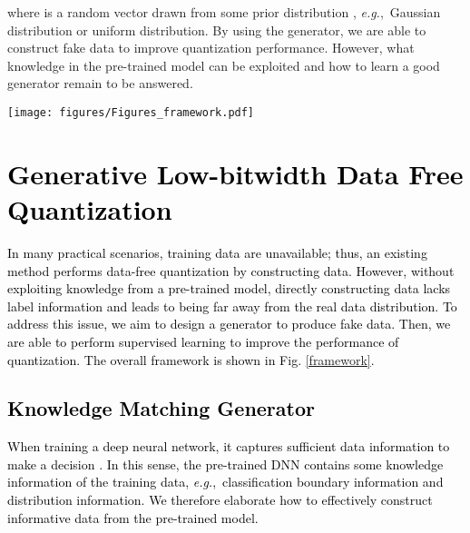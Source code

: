 \documentclass[runningheads]{llncs}
\def\eg{\emph{e.g}\onedot}
\def\eg{\mbox{\textit{e.g.}, }}
\def\mytitle{\textcolor{black}{Generative Low-bitwidth Data Free Quantization }}
\def\jie{\textcolor{black}}
\def\wrong{\textcolor{black}}
\def\new{\textcolor{black}}
\begin{document}
where  is a random vector drawn from some prior distribution , \eg Gaussian distribution or uniform distribution.
By using the generator, we are able to construct fake data to improve quantization performance. 
However, what knowledge in the pre-trained model can be exploited and how to learn a good generator remain to be answered.



\begin{figure*}[t]
\vskip 0.2in
\begin{center}
\centerline{\texttt{[image: figures/Figures\_framework.pdf]}}
\caption{An overview of the proposed method. Given Gaussian noise and \new{the} label as input, the generator creates fake data and feeds them into both \new{the} full-precision model and \new{the} quantized model. The fixed full-precision model provides knowledge for updating the generator. The quantized model learns latent knowledge from the generator and the full-precision model.}
\label{framework}
\end{center}
\vskip -0.2in
\end{figure*}


\section{{\mytitle}}
\label{Method}

\jie{
In many practical scenarios, training data are unavailable\new{; thus,}  an existing method \cite{Cai_2020_CVPR} performs data-free quantization by constructing data.
\wrong{However, without exploiting knowledge from a pre-trained model, directly \new{constructing} data lacks label information and leads to \new{being} far away from the real data distribution.}
To address \new{this issue}, we aim to design a generator to produce fake data.
Then, we are able to perform supervised learning to improve the performance of quantization. 
The overall framework is shown in Fig. \ref{framework}.
}


\subsection{\jie{Knowledge Matching Generator}}
\label{generator}
\jie{
When training a deep neural network, it captures sufficient data information to make a decision \cite{zhang2016understanding}. 
In this sense, the pre-trained DNN contains some knowledge information of the training data, \eg classification boundary information and distribution information.
We therefore elaborate how to effectively construct informative data from the pre-trained model.
}
\end{document}

